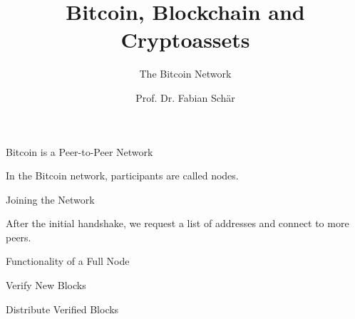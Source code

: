 \documentclass[handout]{beamer}
\title{Bitcoin, Blockchain and Cryptoassets}
\subtitle{The Bitcoin Network}
\author{Prof. Dr. Fabian Schär}
\institute{University of Basel}
\begin{document}
\thispagestyle{empty}
\begin{frame}[noframenumbering]
	\titlepage
\end{frame}

\begin{frame}{Bitcoin is a Peer-to-Peer Network}
	\centering
	\begin{tikzpicture}[scale=1, every node/.style={scale=1}]
		
	\end{tikzpicture}
	
	\vspace{0.5cm}
	
	In the Bitcoin network, participants are called \color{focus}nodes\color{black}.
\end{frame}

\begin{frame}{Joining the Network}
	\begin{center}
		\begin{tikzpicture}[scale=1, every node/.style={scale=1}]
			
		\end{tikzpicture}
	\end{center}

	\vspace{1cm}
	
	After the initial handshake, we request a list of addresses and connect to more peers.
\end{frame}

\begin{frame}{Functionality of a Full Node}
	\centering
	\begin{tikzpicture}[scale=1, every node/.style={scale=1}]
		
	\end{tikzpicture}
\end{frame}


\begin{frame}{Verify New Blocks}
	
	\begin{tikzpicture}[scale=1, every node/.style={scale=1}]
		
	\end{tikzpicture}
\end{frame}

\begin{frame}{Distribute Verified Blocks}
	
	\begin{tikzpicture}[scale=1, every node/.style={scale=1}]
		
	\end{tikzpicture}
\end{frame}
\end{document}
